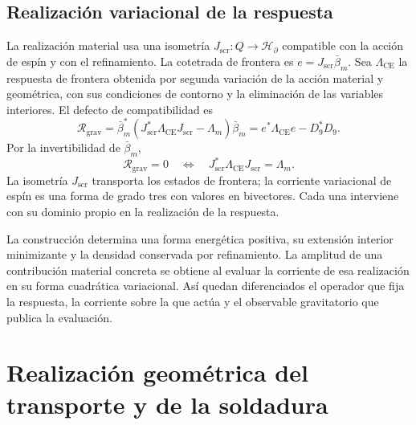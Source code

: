 \section{Realización variacional de la respuesta}
\label{x_reciprocidad:vii:sec:realizacion-respuesta}

La realización material usa una isometría
\(J_{\mathrm{scr}}:Q\longrightarrow\mathcal H_\partial\)
compatible con la acción de espín y con el refinamiento.
La cotetrada de frontera es \(e=J_{\mathrm{scr}}\bar\beta_m\).
Sea \(\Lambda_{\mathrm{CE}}\) la respuesta de frontera obtenida
por segunda variación de la acción material y geométrica, con sus
condiciones de contorno y la eliminación de las variables interiores.
El defecto de compatibilidad es
\begin{equation}
 \mathcal R_{\mathrm{grav}}
 =\bar\beta_m^*
   (J_{\mathrm{scr}}^*\Lambda_{\mathrm{CE}}J_{\mathrm{scr}}-\Lambda_m)
   \bar\beta_m
 =e^*\Lambda_{\mathrm{CE}}e-D_9^*D_9.
 \label{x_reciprocidad:vii:eq:defecto-respuesta}
\end{equation}
Por la invertibilidad de \(\bar\beta_m\),
\[
 \mathcal R_{\mathrm{grav}}=0
 \quad\Longleftrightarrow\quad
 J_{\mathrm{scr}}^*\Lambda_{\mathrm{CE}}J_{\mathrm{scr}}=\Lambda_m.
\]
La isometría \(J_{\mathrm{scr}}\) transporta los estados de frontera;
la corriente variacional de espín es una forma de grado tres con valores
en bivectores. Cada una interviene con su dominio propio en la
realización de la respuesta.

La construcción determina una forma energética positiva, su extensión
interior minimizante y la densidad conservada por refinamiento.
La amplitud de una contribución material concreta se obtiene al evaluar
la corriente de esa realización en su forma cuadrática variacional.
Así quedan diferenciados el operador que fija la respuesta, la corriente
sobre la que actúa y el observable gravitatorio que publica la evaluación.




\chapter{Realización geométrica del transporte y de la soldadura}
\label{x_reciprocidad:vii:sec:realizacion-cartan}

